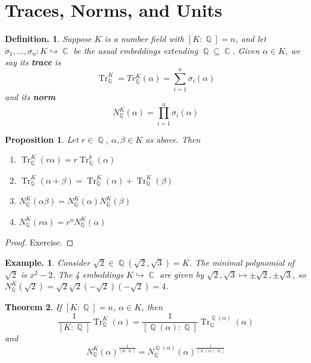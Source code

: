 \documentclass[11pt, a4paper]{memoir}
\DeclareMathOperator{\Q}{{\mathbb{Q}}}
\DeclareMathOperator{\C}{{\mathbb{C}}}
\theoremstyle{change}
\newtheorem{theorem}{Theorem}[section]
\newtheorem{proposition}[theorem]{Proposition}
\theoremstyle{plain}
\theoremstyle{nonumberplain}
\newtheorem{definition}{Definition.}
\newtheorem{example}{Example.}
\newtheorem{proof}{Proof}
\DeclareMathOperator{\Tr}{Tr}
\begin{document}
\section{Traces, Norms, and Units}
\begin{definition}
    Suppose $K$ is a number field with $[K:\Q]=n$, and let $\sigma_1,\ldots,\sigma_n:K\hookrightarrow\C$ be the usual embeddings extending $\Q\subseteq\C$.
    Given $\alpha\in K$, we say its \textbf{trace} is
    \begin{equation*}
        \Tr_{\Q}^K=Tr_{\Q}^K(\alpha)=\sum\limits_{i=1}^n\sigma_i(\alpha)
    \end{equation*}
    and its \textbf{norm}
    \begin{equation*}
        N_{\Q}^K(\alpha)=\prod\limits_{i=1}^n\sigma_i(\alpha)
    \end{equation*}
\end{definition}
\begin{proposition}
    Let $r\in\Q$, $\alpha,\beta\in K$ as above.
    Then
    \begin{enumerate}[nlr]
        \item $\Tr_{\Q}^K(r\alpha)=r\Tr_{\Q}^k(\alpha)$
        \item $\Tr_{\Q}^K(\alpha+\beta)=\Tr_{\Q}^K(\alpha)+\Tr_{\Q}^K(\beta)$
        \item $N_{\Q}^K(\alpha\beta)=N_{\Q}^K(\alpha)N_{\Q}^K(\beta)$
        \item $N_{\Q}^K(r\alpha)=r^nN_{\Q}^K(\alpha)$
    \end{enumerate}
\end{proposition}
\begin{proof}
    Exercise.
\end{proof}
\begin{example}
    Consider $\sqrt{2}\in\Q(\sqrt{2},\sqrt{3})=K$.
    The minimal polynomial of $\sqrt{2}$ is $x^2-2$.
    The 4 embeddings $K\hookrightarrow\C$ are given by $\sqrt{2},\sqrt{3}\mapsto\pm\sqrt{2},\pm\sqrt{3}$, so $N_{\Q}^K(\sqrt{2})=\sqrt{2}\sqrt{2}(-\sqrt{2})(-\sqrt{2})=4$.
\end{example}
\begin{theorem}\label{thm:relntr}
    If $[K:\Q]=n$, $\alpha\in K$, then
    \begin{equation*}
        \frac{1}{[K:\Q]}\Tr_{\Q}^K(\alpha)=\frac{1}{[\Q(\alpha):\Q]}\Tr_{\Q}^{\Q(\alpha)}(\alpha)
    \end{equation*}
    and
    \begin{equation*}
        N_{\Q}^K(\alpha)^{\frac{1}{[K:\Q]}}=N_{\Q}^{\Q(\alpha)}(\alpha)^{\frac{1}{[\Q(\alpha):\Q]}}
    \end{equation*}
\end{theorem}
\end{document}
